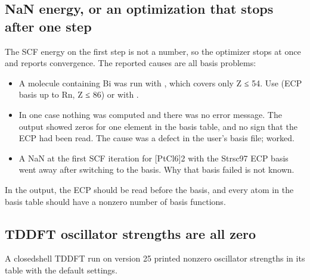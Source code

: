 \documentclass[letterpaper,10pt,english,openany,oneside]{sphinxmanual}
\begin{document}
\subsection{NaN energy, or an optimization that stops after one step}
\label{\detokenize{troubleshooting/common-problems:nan-energy-or-an-optimization-that-stops-after-one-step}}\label{\detokenize{troubleshooting/common-problems:troubleshooting-nan}}
\sphinxAtStartPar
{} The SCF energy on the first step is not a number, so the optimizer stops at once and reports convergence.
The reported causes are all basis problems:
\begin{itemize}
\item {} 
\sphinxAtStartPar
{} A molecule containing Bi was run with , which covers only Z ≤ 54. Use
 (ECP basis up to Rn, Z ≤ 86) or  with {\hyperref[\detokenize{reference/control:control-four}]{}}.



\item {} 
\sphinxAtStartPar
{} In one case nothing was computed and there was no error message. The output showed zeros for one
element in the basis table, and no sign that the ECP had been read. The cause was a defect in the user’s basis file;
 worked. 

\item {} 
\sphinxAtStartPar
A NaN at the first SCF iteration for {[}PtCl6{]}2\sphinxhyphen{} with the St\sphinxhyphen{}rsc\sphinxhyphen{}97 ECP basis went away after switching to the
 basis. Why that basis failed is not known. 

\end{itemize}

\sphinxAtStartPar
{} In the output, the ECP should be read before the basis, and every atom in the basis table should
have a non\sphinxhyphen{}zero number of basis functions.




\subsection{TDDFT oscillator strengths are all zero}
\label{\detokenize{troubleshooting/common-problems:tddft-oscillator-strengths-are-all-zero}}
\sphinxAtStartPar
A closed\sphinxhyphen{}shell TDDFT run on version 25 printed non\sphinxhyphen{}zero oscillator strengths in its  table
with the default settings. 
\end{document}
